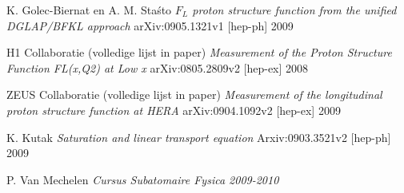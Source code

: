 \documentclass[a4paper,11pt]{article}
\numberwithin{equation}{section} %
\begin{document}
\begin{thebibliography}{99}
  K. Golec-Biernat en A. M. Staśto
  \emph{$F_L$ proton structure function from the unified DGLAP/BFKL approach}
  arXiv:0905.1321v1 [hep-ph]
  2009

  H1 Collaboratie (volledige lijst in paper)
  \emph{Measurement of the Proton Structure Function FL(x,Q2) at Low x}
  arXiv:0805.2809v2 [hep-ex]
  2008

  ZEUS Collaboratie (volledige lijst in paper)
  \emph{Measurement of the longitudinal proton structure function at HERA}
  arXiv:0904.1092v2 [hep-ex]
  2009

  K. Kutak
  \emph{Saturation and linear transport equation}
  Arxiv:0903.3521v2 [hep-ph]
  2009

  P. Van Mechelen
  \emph{Cursus Subatomaire Fysica 2009-2010}

\end{thebibliography}
\end{document}
